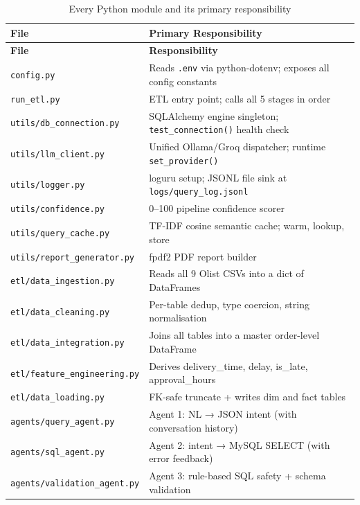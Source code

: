 \documentclass[12pt,a4paper]{report}
\begin{document}
\begin{longtable}{lp{10cm}}
  \caption{Every Python module and its primary responsibility} \\
  \toprule
  \textbf{File} & \textbf{Primary Responsibility} \\
  \midrule
  \endfirsthead
  \toprule \textbf{File} & \textbf{Responsibility} \\ \midrule
  \endhead
  \bottomrule \endlastfoot

  \texttt{config.py}                    & Reads \texttt{.env} via python-dotenv; exposes all config constants \\
  \texttt{run\_etl.py}                  & ETL entry point; calls all 5 stages in order \\
  \texttt{utils/db\_connection.py}      & SQLAlchemy engine singleton; \texttt{test\_connection()} health check \\
  \texttt{utils/llm\_client.py}         & Unified Ollama/Groq dispatcher; runtime \texttt{set\_provider()} \\
  \texttt{utils/logger.py}             & loguru setup; JSONL file sink at \texttt{logs/query\_log.jsonl} \\
  \texttt{utils/confidence.py}         & 0--100 pipeline confidence scorer \\
  \texttt{utils/query\_cache.py}       & TF-IDF cosine semantic cache; warm, lookup, store \\
  \texttt{utils/report\_generator.py}  & fpdf2 PDF report builder \\
  \texttt{etl/data\_ingestion.py}      & Reads all 9 Olist CSVs into a dict of DataFrames \\
  \texttt{etl/data\_cleaning.py}       & Per-table dedup, type coercion, string normalisation \\
  \texttt{etl/data\_integration.py}    & Joins all tables into a master order-level DataFrame \\
  \texttt{etl/feature\_engineering.py} & Derives delivery\_time, delay, is\_late, approval\_hours \\
  \texttt{etl/data\_loading.py}        & FK-safe truncate + writes dim and fact tables \\
  \texttt{agents/query\_agent.py}      & Agent 1: NL → JSON intent (with conversation history) \\
  \texttt{agents/sql\_agent.py}        & Agent 2: intent → MySQL SELECT (with error feedback) \\
  \texttt{agents/validation\_agent.py} & Agent 3: rule-based SQL safety + schema validation \\

\end{longtable}
\end{document}
